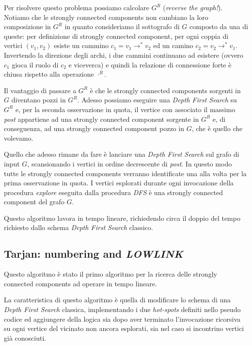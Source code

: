 Per risolvere questo problema possiamo calcolare $G^{R}$
(\emph{reverse the graph!}). Notiamo che le strongly connected
components non cambiano la loro composizione in $G^{R}$ in quanto
consideriamo il sottografo di $G$ composto da una di queste: per
definizione di strongly connected component, per ogni coppia di
vertici $(v_{1}, v_{2})$ esiste un cammino $c_{1} =
v_{1}\rightarrow^{*} v_{2}$ ed un camino $c_{2} = v_{2}\rightarrow^{*}
v_{1}$. Invertendo la direzione degli archi, i due cammini continuano
ad esistere (ovvero $c_{1}$ gioca il ruolo di $c_{2}$ e viceverca) e
quindi la relazione di connessione forte \`e chiusa rispetto alla
operazione $\cdot ^{R}$.

Il vantaggio di passare a $G^{R}$ \`e che le strongly connected
components sorgenti in $G$ diventano pozzi in $G^{R}$. Adesso possiamo
eseguire una \emph{Depth First Search} su $G^{R}$ e, per la seconda
osservazione in quota, il vertice con associato il massimo \emph{post}
appartiene ad una strongly connected component sorgente in $G^{R}$ e,
di conseguenza, ad una strongly connected component pozzo in $G$, che
\`e quello che volevamo.

Quello che adesso rimane da fare \`e lanciare una \emph{Depth First
  Search} sul grafo di input $G$, scansionando i vertici in ordine
decrescente di \emph{post}. In questo modo tutte le strongly connected
components verranno identificate una alla volta per la prima
osservazione in quota. I vertici esplorati durante ogni invocazione
della procedura \emph{explore} eseguita dalla procedura \emph{DFS} \`e
una strongly connected component del grafo $G$.

Questo algoritmo lavora in tempo lineare, richiedendo circa il doppio
del tempo richiesto dallo schema \emph{Depth First Search} classico.

\subsection{Tarjan: numbering and \emph{LOWLINK}}
\label{subsection:tarjan-algorithm}
Questo algoritmo \`e stato il primo algoritmo per la ricerca delle
strongly connected components ad operare in tempo lineare.

La caratteristica di questo algoritmo \`e quella di modificare lo
schema di una \emph{Depth First Search} classica, implementando i due
\emph{hot-spots} definiti nello pseudo codice ed aggiungere della
logica sia dopo aver terminato l'invocazione ricorsiva su ogni vertice
del vicinato non ancora esplorati, sia nel caso si incontrino vertici
gi\`a conosciuti.

